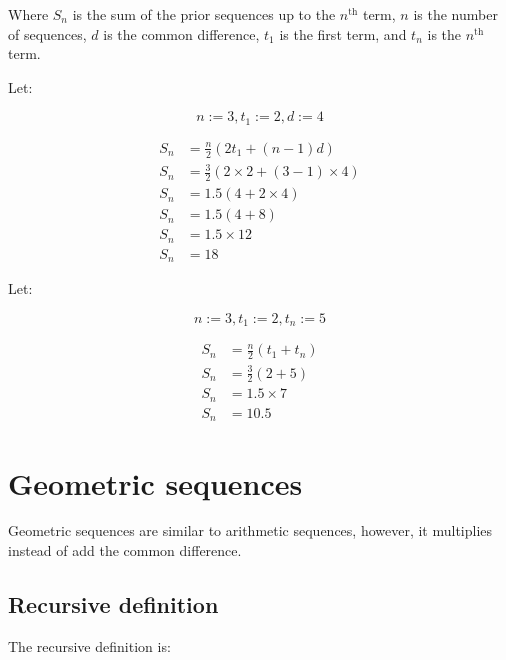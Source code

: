 \documentclass{book}
\newenvironment{generalInformation}{}{}
\newenvironment{explanationOfTerms}{}{}
\newenvironment{example}{}{}
\begin{document}
\begin{explanationOfTerms}
	Where $S_n$ is the sum of the prior sequences up to the $n^{\text{th}}$ term, $n$ is the number of sequences, $d$ is the common difference, $t_1$ is the first term, and $t_n$ is the $n^{\text{th}}$ term.
\end{explanationOfTerms}

\begin{example}
	Let:

	\[
		n := 3, t_1 := 2, d := 4
	\]

	\begin{align*}
		S_n & = \frac{n}{2}(2t_1 + (n - 1)d)               \\
		S_n & = \frac{3}{2}(2 \times 2 + (3 - 1) \times 4) \\
		S_n & = 1.5(4 + 2 \times 4)                        \\
		S_n & = 1.5(4 + 8)                                 \\
		S_n & = 1.5 \times 12                              \\
		S_n & = 18
	\end{align*}
\end{example}

\begin{example}
	Let:

	\[
		n := 3, t_1 := 2, t_n := 5
	\]

	\begin{align*}
		S_n & = \frac{n}{2}(t_1 + t_n) \\
		S_n & = \frac{3}{2}(2 + 5)     \\
		S_n & = 1.5 \times 7           \\
		S_n & = 10.5
	\end{align*}
\end{example}



\section{Geometric sequences}
\begin{generalInformation}
	Geometric sequences are similar to arithmetic sequences, however, it multiplies instead of add the common difference.
\end{generalInformation}


\subsection{Recursive definition}
The recursive definition is:
\end{document}
